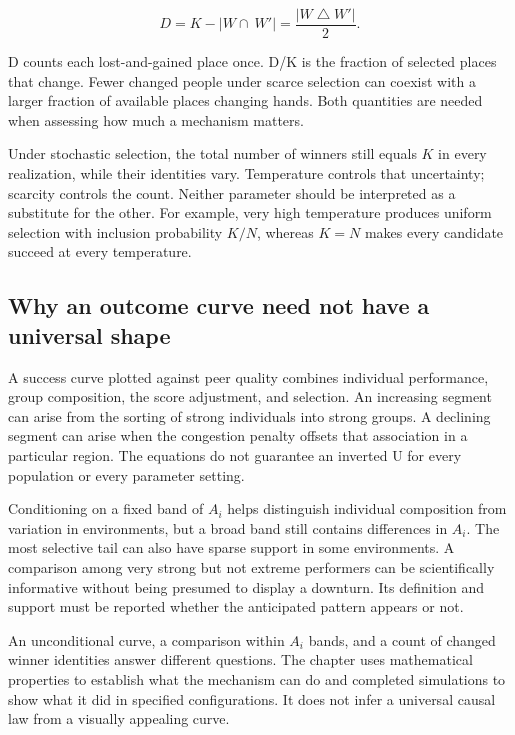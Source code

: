 \[
D = K - |W \cap \ W'| = \frac{|W \bigtriangleup W'|}{2}.
\]

D counts each lost-and-gained place once. D/K is the fraction of selected places that change. Fewer changed people under scarce selection can coexist with a larger fraction of available places changing hands. Both quantities are needed when assessing how much a mechanism matters.

Under stochastic selection, the total number of winners still equals \(K\) in every realization, while their identities vary. Temperature controls that uncertainty; scarcity controls the count. Neither parameter should be interpreted as a substitute for the other. For example, very high temperature produces uniform selection with inclusion probability \(K/N\), whereas \(K = N\) makes every candidate succeed at every temperature.

\subsection{Why an outcome curve need not have a universal shape}\label{why-an-outcome-curve-need-not-have-a-universal-shape}

A success curve plotted against peer quality combines individual performance, group composition, the score adjustment, and selection. An increasing segment can arise from the sorting of strong individuals into strong groups. A declining segment can arise when the congestion penalty offsets that association in a particular region. The equations do not guarantee an inverted U for every population or every parameter setting.

Conditioning on a fixed band of \(A_{i}\) helps distinguish individual composition from variation in environments, but a broad band still contains differences in \(A_{i}\). The most selective tail can also have sparse support in some environments. A comparison among very strong but not extreme performers can be scientifically informative without being presumed to display a downturn. Its definition and support must be reported whether the anticipated pattern appears or not.

An unconditional curve, a comparison within \(A_{i}\) bands, and a count of changed winner identities answer different questions. The chapter uses mathematical properties to establish what the mechanism can do and completed simulations to show what it did in specified configurations. It does not infer a universal causal law from a visually appealing curve.

